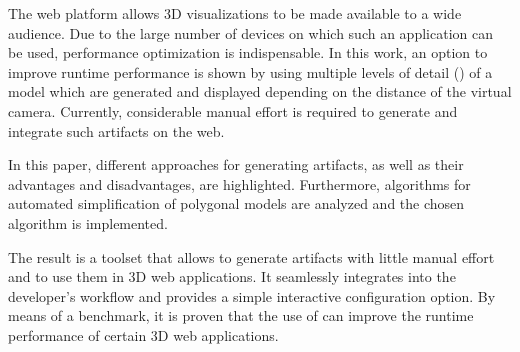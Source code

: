 
The web platform allows 3D visualizations to be made available to a wide audience. Due to the large number of devices on which such an application can be used, performance optimization is indispensable. In this work, an option to improve runtime performance is shown by using multiple levels of detail () of a model which are generated and displayed depending on the distance of the virtual camera. Currently, considerable manual effort is required to generate and integrate such artifacts on the web.

In this paper, different approaches for generating  artifacts, as well as their advantages and disadvantages, are highlighted.
Furthermore, algorithms for automated simplification of polygonal models are analyzed and the chosen algorithm is implemented.

The result is a toolset that allows to generate  artifacts with little manual effort and to use them in 3D web applications.
It seamlessly integrates into the developer's workflow and provides a simple interactive configuration option.
By means of a benchmark, it is proven that the use of  can improve the runtime performance of certain 3D web applications.
